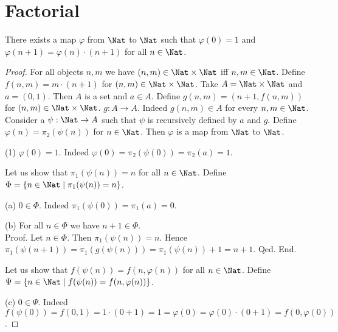 \documentclass{article}
\begin{document}
  \section{Factorial}\label{sec:factorial}

  \begin{forthel}
    \begin{lemma}\label{fac_existence}
      There exists a map $\varphi$ from $\Nat$ to $\Nat$ such that
      $\varphi(0) = 1$ and $\varphi(n + 1) = \varphi(n) \cdot (n + 1)$ for all
      $n \in \Nat$.
    \end{lemma}
    \begin{proof}
      For all objects $n, m$ we have $(n,m) \in \Nat \times \Nat$ iff $n, m \in
      \Nat$.
      Define $f(n,m) = m \cdot (n + 1)$ for $(n,m) \in \Nat \times \Nat$.
      Take $A = \Nat \times \Nat$ and $a = (0,1)$.
      Then $A$ is a set and $a \in A$.
      Define $g(n,m) = (n + 1, f(n,m))$ for $(n,m) \in \Nat \times \Nat$.
      $g : A \to A$.
      Indeed $g(n,m) \in A$ for every $n, m \in \Nat$.
      Consider a $\psi : \Nat \to A$ such that $\psi$ is recursively defined by
      $a$ and $g$.
      Define $\varphi(n) = \pi_{2}(\psi(n))$ for $n \in \Nat$.
      Then $\varphi$ is a map from $\Nat$ to $\Nat$.

      (1) $\varphi(0) = 1$.
      Indeed $\varphi(0)
        = \pi_{2}(\psi(0))
        = \pi_{2}(a)
        = 1$.

      Let us show that $\pi_{1}(\psi(n)) = n$ for all $n \in \Nat$.
        Define $\Phi = \{ n \in \Nat \mid \pi_{1}(\psi(n)) = n \}$.

        (a) $0 \in \Phi$.
        Indeed $\pi_{1}(\psi(0))
          = \pi_{1}(a)
          = 0$.

        (b) For all $n \in \Phi$ we have $n + 1 \in \Phi$. \\
        Proof.
          Let $n \in \Phi$.
          Then $\pi_{1}(\psi(n)) = n$.
          Hence $\pi_{1}(\psi(n + 1))
            = \pi_{1}(g(\psi(n)))
            = \pi_{1}(\psi(n)) + 1
            = n + 1$.
        Qed.
      End.

      Let us show that $f(\psi(n)) = f(n, \varphi(n))$ for all $n \in \Nat$.
        Define $\Psi = \{ n \in \Nat \mid f(\psi(n)) = f(n, \varphi(n)) \}$.

        (c) $0 \in \Psi$.
        Indeed $f(\psi(0))
          = f(0,1)
          = 1 \cdot (0 + 1)
          = 1
          = \varphi(0)
          = \varphi(0) \cdot (0 + 1)
          = f(0, \varphi(0))$.


\end{proof}
\end{forthel}
\end{document}
